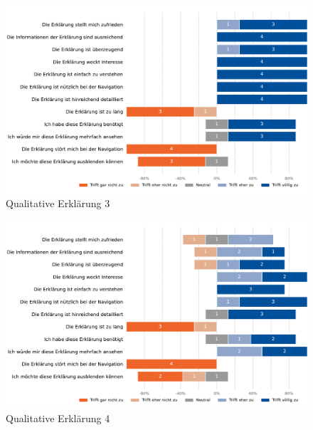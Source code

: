 \begin{figure}[htb!]
    \centering
    \includegraphics[width=\linewidth]{contents/06_model_evaluation/02_evaluation/res/qualitativeFeedback-03_traffic_volume.pdf}
    \caption{Qualitative Erklärung 3}
    \label{fig:qualitative_evaluation_explanation3}
\end{figure}

\begin{figure}[htb!]
    \centering
    \includegraphics[width=\linewidth]{contents/06_model_evaluation/02_evaluation/res/qualitativeFeedback-04_position_accuracy.pdf}
    \caption{Qualitative Erklärung 4}
    \label{fig:qualitative_evaluation_explanation4}
\end{figure}